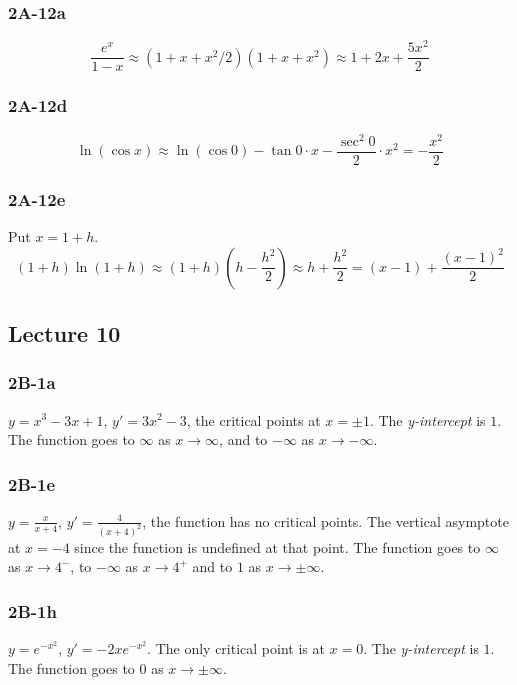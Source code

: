 \documentclass{article}
\begin{document}
\subsubsection{2A-12a}
\[ \frac{e^x}{1-x} \approx (1+x+x^2/2)(1+x+x^2) \approx 1 + 2x + \frac{5x^2}{2}  \]

\subsubsection{2A-12d}
\[ \ln{(\cos x)} \approx \ln{(\cos0) - \tan{0}\cdot x - \frac{\sec^2{0}}{2} \cdot x^2} = -\frac{x^2}{2} \]

\subsubsection{2A-12e}
Put $x = 1+h$.
\[ (1+h)\ln{(1+h) \approx (1+h)\left( h - \frac{h^2}{2} \right)} \approx h + \frac{h^2}{2} = (x-1) + \frac{(x-1)^2}{2} \]

\newpage
\subsection{Lecture 10}
\subsubsection{2B-1a}
$y = x^3 -3x + 1$, $y' = 3x^2-3$, the critical points at $x = \pm 1$. The \textit{y-intercept} is $1$.  The function goes to $\infty$ as $x \to \infty$, and to $-\infty$ as $x \to -\infty$.

\begin{figure}[htp!]
    \centering
    
    \label{fig:fig1}
\end{figure}

\newpage
\subsubsection{2B-1e}
$y = \frac{x}{x+4}$, $y' = \frac{4}{(x+4)^2}$, the function has no critical points. The vertical asymptote at $x = -4$ since the function is undefined at that point. The function goes to $\infty$ as $x \to 4^{-}$, to $-\infty$ as $x \to 4^{+}$ and to $1$ as $x \to \pm \infty$.

\begin{figure}[htp!]
    \centering
    
    \label{fig:fig2}
\end{figure}

\newpage
\subsubsection{2B-1h}
$y = e^{-x^2}$, $y' = -2xe^{-x^2}$. The only critical point is at $x = 0$. The \textit{y-intercept} is $1$. The function goes to $0$ as $x \to \pm \infty$.
\end{document}
